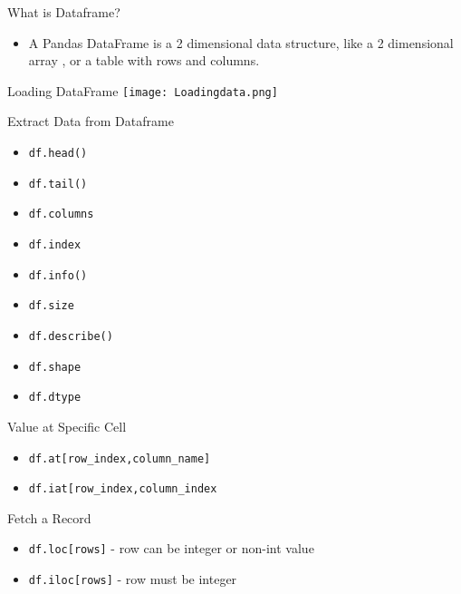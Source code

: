 \documentclass[serif, aspectratio=169]{beamer}
\begin{document}
\begin{frame}{What is Dataframe?}
    \begin{itemize}
        \item A Pandas DataFrame is a 2 dimensional data structure, like a 2 dimensional array , or a table with rows and columns.
    \end{itemize}
\end{frame}

\begin{frame}{Loading DataFrame}
    \centering
    \texttt{[image: Loadingdata.png]}
\end{frame}

\begin{frame}{Extract Data from Dataframe}
    \begin{itemize}
        \item \texttt{\color{red}df.head()}
        \item \texttt{\color{red}df.tail()}
        \item \texttt{\color{red}df.columns}
        \item \texttt{\color{red}df.index}
        \item \texttt{\color{red}df.info()}
        \item \texttt{\color{red}df.size}
        \item \texttt{\color{red}df.describe()}
        \item \texttt{\color{red}df.shape}
        \item \texttt{\color{red}df.dtype}
    \end{itemize}
\end{frame}

\begin{frame}{Value at Specific Cell}
    \begin{itemize}
        \item \texttt{\color{red}df.at[row\_index,column\_name]}
        \item \texttt{\color{red}df.iat[row\_index,column\_index}
    \end{itemize}
\end{frame}

\begin{frame}{Fetch a Record}
    \begin{itemize}
        \item \texttt{\color{red}df.loc[rows]} - row can be integer or non-int value
        \item \texttt{\color{red}df.iloc[rows]} - row must be integer
    \end{itemize}
\end{frame}
\end{document}
